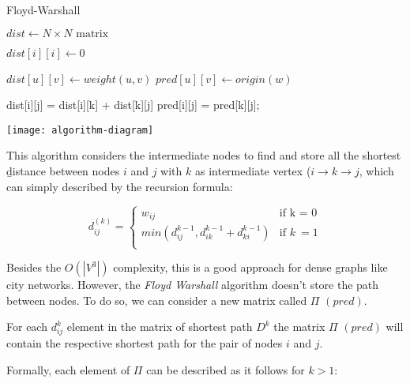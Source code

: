 \documentclass{article}
\begin{document}
    \begin{algorithm}[h]
    \caption{Floyd-Warshall}\label{euclid}
    \begin{algorithmic}[1]
        \State $dist \gets N \times N \text{ matrix}$

            \State $dist[i][i] \gets 0$
        \EndFor
        
            \State $dist[u][v] \gets weight(u, v)$
            \State $pred[u][v] \gets origin(w)$ 
        \EndFor
        
                        \State dist[i][j] = dist[i][k] + dist[k][j]
                        \State pred[i][j] = pred[k][j];
                    \EndIf
                \EndFor
            \EndFor
        \EndFor
    \EndProcedure
    \end{algorithmic}
    \end{algorithm}

    \texttt{[image: algorithm-diagram]}

    This algorithm considers the intermediate nodes to find and store all the shortest \b{distance} between nodes $i$ and $j$ with $k$ as intermediate vertex ($i \rightarrow k \rightarrow j$, which can simply described by the recursion formula: 
    
    \begin{equation} 
      d_{ij}^{(k)} =
        \begin{cases}
          w_{ij} & \text{if k = 0}\\
          min(d_{ij}^{k-1}, d_{ik}^{k-1} + d_{ki}^{k-1}) & \text{if } k\>= 1\\
        \end{cases}       
    \end{equation}
    
    Besides the $O(|V^3|)$ complexity, this is a good approach for dense graphs like city networks.
    However, the \textit{Floyd Warshall} algorithm doesn't store the path between nodes. To do so, we can consider a new matrix called $\Pi$ $(pred)$. \par
    For each $d_{ij}^{k}$ element in the matrix of shortest path $D^k$ the matrix $\Pi$ $(pred)$ will contain the respective shortest path for the pair of nodes $i$ and $j$. \par
    Formally, each element of $\Pi$ can be described as it follows for $k>1$:
    
\end{document}
